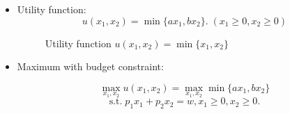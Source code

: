 \documentclass[
12pt, %
a4paper, %
onecolumn, %
portrait %
]{article}
\begin{document}
\begin{itemize}
	\item Utility function:
	\[
	u(x_1,x_2)=\min\{ax_1,bx_2\}.\;(x_1\ge0,x_2\ge 0)
	\]
	\begin{figure}[H]
		\centering
		\caption{Utility function $u(x_1,x_2)=\min\{x_1,x_2\}$}
		\label{Fig.lable}
	\end{figure}	
	
	
	\item Maximum with budget constraint:
	
	\[
	\max_{x_1,x_2} u(x_1,x_2)=\max_{x_1,x_2}\min\{ax_1,bx_2\}
	\]
	\[
	\text{s.t.}\;p_1x_1+p_2x_2=w,x_1\ge0,x_2\ge 0.
	\]


\end{itemize}
\end{document}
